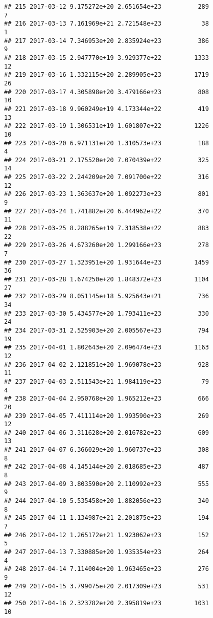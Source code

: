 \documentclass[]{article}
\begin{document}
\begin{verbatim}
## 215 2017-03-12 9.175272e+20 2.651654e+23          289               7
## 216 2017-03-13 7.161969e+21 2.721548e+23           38               1
## 217 2017-03-14 7.346953e+20 2.835924e+23          386               9
## 218 2017-03-15 2.947770e+19 3.929377e+22         1333              12
## 219 2017-03-16 1.332115e+20 2.289905e+23         1719              26
## 220 2017-03-17 4.305898e+20 3.479166e+23          808              10
## 221 2017-03-18 9.960249e+19 4.173344e+22          419              13
## 222 2017-03-19 1.306531e+19 1.601807e+22         1226              10
## 223 2017-03-20 6.971131e+20 1.310573e+23          188               4
## 224 2017-03-21 2.175520e+20 7.070439e+22          325              14
## 225 2017-03-22 2.244209e+20 7.091700e+22          316              12
## 226 2017-03-23 1.363637e+20 1.092273e+23          801               9
## 227 2017-03-24 1.741882e+20 6.444962e+22          370              11
## 228 2017-03-25 8.288265e+19 7.318538e+22          883              22
## 229 2017-03-26 4.673260e+20 1.299166e+23          278               7
## 230 2017-03-27 1.323951e+20 1.931644e+23         1459              36
## 231 2017-03-28 1.674250e+20 1.848372e+23         1104              27
## 232 2017-03-29 8.051145e+18 5.925643e+21          736              34
## 233 2017-03-30 5.434577e+20 1.793411e+23          330              24
## 234 2017-03-31 2.525903e+20 2.005567e+23          794              19
## 235 2017-04-01 1.802643e+20 2.096474e+23         1163              12
## 236 2017-04-02 2.121851e+20 1.969078e+23          928              11
## 237 2017-04-03 2.511543e+21 1.984119e+23           79               4
## 238 2017-04-04 2.950768e+20 1.965212e+23          666              20
## 239 2017-04-05 7.411114e+20 1.993590e+23          269              12
## 240 2017-04-06 3.311628e+20 2.016782e+23          609              13
## 241 2017-04-07 6.366029e+20 1.960737e+23          308               8
## 242 2017-04-08 4.145144e+20 2.018685e+23          487               8
## 243 2017-04-09 3.803590e+20 2.110992e+23          555               9
## 244 2017-04-10 5.535458e+20 1.882056e+23          340               8
## 245 2017-04-11 1.134987e+21 2.201875e+23          194               7
## 246 2017-04-12 1.265172e+21 1.923062e+23          152               5
## 247 2017-04-13 7.330885e+20 1.935354e+23          264               4
## 248 2017-04-14 7.114004e+20 1.963465e+23          276               9
## 249 2017-04-15 3.799075e+20 2.017309e+23          531              12
## 250 2017-04-16 2.323782e+20 2.395819e+23         1031              10

\end{verbatim}
\end{document}
